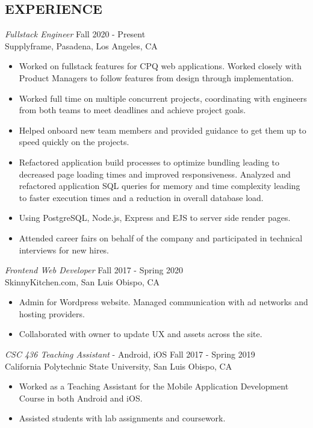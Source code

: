 \documentclass[margin]{res}
\begin{document}
\begin{resume}
\section{EXPERIENCE} 
	{\sl Fullstack Engineer} \hfill Fall 2020 - Present \\
	Supplyframe, Pasadena, Los Angeles, CA
	\begin{itemize}  \itemsep -2pt %
		\item Worked on fullstack features for CPQ web applications. Worked closely with Product Managers to follow features from design through implementation.
		\item Worked full time on multiple concurrent projects, coordinating with engineers from both teams to meet deadlines and achieve project goals.
		\item Helped onboard new team members and provided guidance to get them up to speed quickly on the projects.
		\item Refactored application build processes to optimize bundling leading to decreased page loading times and improved responsiveness. Analyzed and refactored application SQL queries for memory and time complexity leading to faster execution times and a reduction in overall database load.
		\item Using PostgreSQL, Node.js, Express and EJS to server side render pages.
		\item Attended career fairs on behalf of the company and participated in technical interviews for new hires. 
	\end{itemize}
	
	{\sl Frontend Web Developer} \hfill Fall 2017 - Spring 2020 \\
	SkinnyKitchen.com, San Luis Obispo, CA
	\begin{itemize}  \itemsep -2pt %
		\item Admin for Wordpress website. Managed communication with ad networks and hosting providers.
		\item Collaborated with owner to update UX and assets across the site.
	\end{itemize}
	
	{\sl CSC 436 Teaching Assistant} - Android, iOS \hfill Fall 2017 - Spring 2019 \\
	California Polytechnic State University, San Luis Obispo, CA
	\begin{itemize}  \itemsep -2pt %
		\item Worked as a Teaching Assistant for the Mobile Application Development Course in both Android and iOS.
		\item Assisted students with lab assignments and coursework.
	\end{itemize}


\end{resume}
\end{document}
